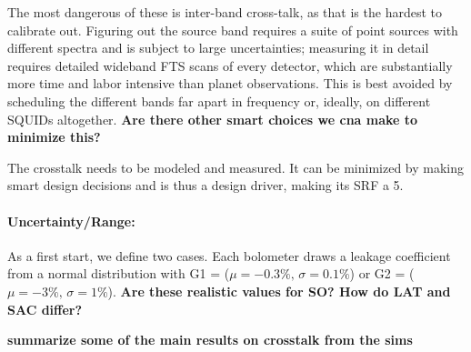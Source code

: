 The most dangerous of these is inter-band cross-talk, as that is the hardest to calibrate out.
Figuring out the source band requires a suite of point sources with different spectra and is subject to large uncertainties; measuring it in detail requires detailed wideband FTS scans of every detector, which are substantially more time and labor intensive than planet observations.
This is best avoided by scheduling the different bands far apart in frequency or, ideally, on different SQUIDs altogether. \textbf{Are there other smart choices we cna make to minimize this?}

The crosstalk needs to be modeled and measured. It can be minimized by making smart design decisions and is thus a design driver, making its SRF a 5.

\paragraph{Uncertainty/Range:}
As a first start, we define two cases.
Each bolometer draws a leakage coefficient from a normal distribution with G1 = ($\mu=-0.3\%,\, \sigma=0.1\%$) or G2 = ($\mu=-3\%,\, \sigma=1\%$).
\textbf{Are these realistic values for SO? How do LAT and SAC differ?}

\textbf{summarize some of the main results on crosstalk from the sims}

